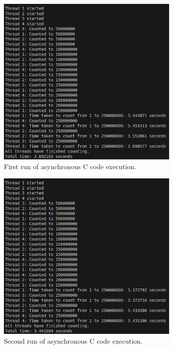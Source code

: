 \documentclass[12pt,a4paper]{article}
\begin{document}
\begin{figure}[htbp]
    \centering
    \includegraphics[width=0.8\textwidth]{../async_records/results_c/result_1.png}
    \caption{First run of asynchronous C code execution.}
    \label{fig:C-async-runtime-1}
\end{figure}

\begin{figure}[htbp]
    \centering
    \includegraphics[width=0.8\textwidth]{../async_records/results_c/result_2.png}
    \caption{Second run of asynchronous C code execution.}
    \label{fig:C-async-runtime-2}
\end{figure}
\end{document}
